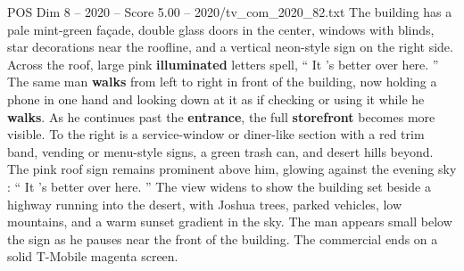\begin{textsample}{POS Dim 8 – 2020 – Score 5.00 – 2020/tv\_com\_2020\_82.txt}
The building has a pale mint-green façade, double glass doors in the center, windows with blinds, star decorations near the roofline, and a vertical neon-style sign on the right side.
Across the roof, large pink \textbf{illuminated} letters spell, “ It ’s better over here. ” The same man \textbf{walks} from left to right in front of the building, now holding a phone in one hand and looking down at it as if checking or using it while he \textbf{walks}.
As he continues past the \textbf{entrance}, the full \textbf{storefront} becomes more visible.
To the right is a service-window or diner-like section with a red trim band, vending or menu-style signs, a green trash can, and desert hills beyond.
The pink roof sign remains prominent above him, glowing against the evening sky : “ It ’s better over here. ” The view widens to show the building set beside a highway running into the desert, with Joshua trees, parked vehicles, low mountains, and a warm sunset gradient in the sky.
The man appears small below the sign as he pauses near the front of the building.
The commercial ends on a solid T-Mobile magenta screen.

\end{textsample}
